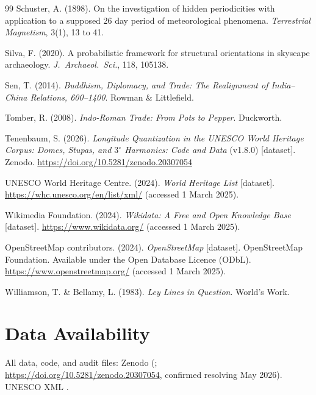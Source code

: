 \documentclass[12pt,a4paper]{article}
\begin{document}
\begin{thebibliography}{99}
Schuster, A. (1898). On the investigation of hidden periodicities with
application to a supposed 26 day period of meteorological phenomena.
\textit{Terrestrial Magnetism}, 3(1), 13 to 41.

Silva, F. (2020). A probabilistic framework for structural orientations
in skyscape archaeology. \textit{J.\ Archaeol.\ Sci.}, 118, 105138.

Sen, T. (2014). \textit{Buddhism, Diplomacy, and Trade: The Realignment
of India--China Relations, 600--1400}. Rowman \& Littlefield.

Tomber, R. (2008). \textit{Indo-Roman Trade: From Pots to Pepper}.
Duckworth.

Tenenbaum, S. (2026). \textit{Longitude Quantization in the UNESCO
World Heritage Corpus: Domes, Stupas, and $3^\circ$ Harmonics: Code
and Data} (v1.8.0) [dataset]. Zenodo.
\url{https://doi.org/10.5281/zenodo.20307054}

{UNESCO World Heritage Centre}. (2024). \textit{World Heritage List}
[dataset]. \url{https://whc.unesco.org/en/list/xml/}
(accessed 1 March 2025).

{Wikimedia Foundation}. (2024). \textit{Wikidata: A Free and Open
Knowledge Base} [dataset]. \url{https://www.wikidata.org/}
(accessed 1 March 2025).

{OpenStreetMap contributors}. (2024). \textit{OpenStreetMap} [dataset].
OpenStreetMap Foundation. Available under the Open Database Licence (ODbL).
\url{https://www.openstreetmap.org/} (accessed 1 March 2025).

Williamson, T. \& Bellamy, L. (1983). \textit{Ley Lines in Question}.
World's Work.

\end{thebibliography}

\section*{Data Availability}
All data, code, and audit files: Zenodo (\citealt{tenenbaum2026audit};
\url{https://doi.org/10.5281/zenodo.20307054}, confirmed resolving May 2026).
UNESCO XML \citep{unescowhc2024xml}.
\end{document}
